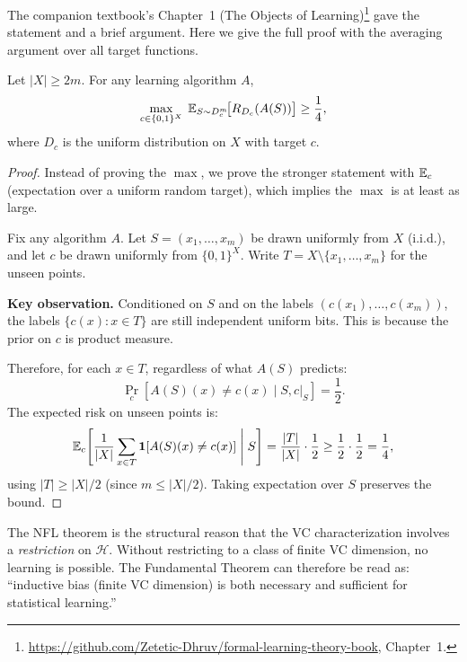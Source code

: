 The companion textbook's Chapter~1 (The Objects of Learning)\footnote{\url{https://github.com/Zetetic-Dhruv/formal-learning-theory-book}, Chapter~1.} gave the statement and a brief argument.
Here we give the full proof with the averaging argument over all target
functions.

\begin{thm}
\label{thm:nfl-full}
Let $|X| \geq 2m$.  For any learning algorithm $A$,
\[
  \max_{c \in \{0,1\}^X}\;
  \mathbb{E}_{S \sim D_c^m}\!\bigl[R_{D_c}(A(S))\bigr] \geq \frac{1}{4},
\]
where $D_c$ is the uniform distribution on $X$ with target $c$.
\end{thm}

\begin{proof}
Instead of proving the $\max$, we prove the stronger statement with $\mathbb{E}_c$
(expectation over a uniform random target), which implies the $\max$ is at
least as large.

Fix any algorithm $A$.  Let $S = (x_1, \ldots, x_m)$ be drawn uniformly from
$X$ (i.i.d.), and let $c$ be drawn uniformly from $\{0,1\}^X$.  Write
$T = X \setminus \{x_1, \ldots, x_m\}$ for the unseen points.

\medskip
\noindent\textbf{Key observation.}  Conditioned on $S$ and on the labels
$(c(x_1), \ldots, c(x_m))$, the labels $\{c(x) : x \in T\}$ are still
independent uniform bits.  This is because the prior on $c$ is product
measure.

Therefore, for each $x \in T$, regardless of what $A(S)$ predicts:
\[
  \Pr_{c}[A(S)(x) \neq c(x) \mid S, c|_S] = \frac{1}{2}.
\]
The expected risk on unseen points is:
\[
  \mathbb{E}_c\!\left[\frac{1}{|X|}\sum_{x \in T} \mathbf{1}[A(S)(x) \neq c(x)]
  \;\middle|\; S\right]
  = \frac{|T|}{|X|} \cdot \frac{1}{2}
  \geq \frac{1}{2} \cdot \frac{1}{2} = \frac{1}{4},
\]
using $|T| \geq |X|/2$ (since $m \leq |X|/2$).  Taking expectation over $S$
preserves the bound.
\end{proof}

\begin{remark}
\label{rmk:nfl-revisited}
The NFL theorem is the structural reason that the VC characterization involves
a \emph{restriction} on $\mathcal{H}$.  Without restricting to a class of
finite VC dimension, no learning is possible.  The Fundamental Theorem can
therefore be read as: ``inductive bias (finite VC dimension) is both necessary
and sufficient for statistical learning.''
\end{remark}


